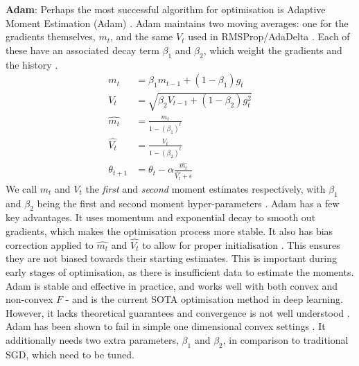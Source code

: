 \textbf{Adam}: Perhaps the most successful algorithm for optimisation is Adaptive Moment Estimation (Adam) \citep{kingma2014adam}. Adam maintains two moving averages: one for the gradients themselves, $m_t$, and the same $V_t$ used in RMSProp/AdaDelta \citep{kingma2014adam}. Each of these have an associated decay term $\beta_1$ and $\beta_2$, which weight the gradients and the history \citep{kingma2014adam}.
\begin{align}
m_t &= \beta_1 m_{t-1} + (1 - \beta_1) g_t \label{eq:m_t} \\
V_t &= \sqrt{\beta_2 V_{t-1} + (1 - \beta_2) g_t^2} \\
\hat{m_t} &= \frac{m_t}{1 - (\beta_1)^t} \\
\hat{V_t} &= \frac{V_t}{1 - (\beta_2)^t} \\
\theta_{t+1} &= \theta_t - \alpha \frac{\hat{m_t}}{{\hat{V_t}} + \epsilon} \label{eq:adam_update}
\end{align}
We call $m_t$ and $V_t$ the \textit{first} and \textit{second} moment estimates respectively, with $\beta_1$ and $\beta_2$ being the first and second moment hyper-parameters \citep{kingma2014adam}. Adam has a few key advantages. It uses momentum and exponential decay to smooth out gradients, which makes the optimisation process more stable. It also has bias correction applied to $\hat{m_t}$ and $\hat{V_t}$ to allow for proper initialisation \citep{kingma2014adam}. This ensures they are not biased towards their starting estimates. This is important during early stages of optimisation, as there is insufficient data to estimate the moments. Adam is stable and effective in practice, and works well with both convex and non-convex $F$ - and is the current SOTA optimisation method in deep learning. However, it lacks theoretical guarantees and convergence is not well understood \citep{reddi2019asmgrad}. Adam has been shown to fail in simple one dimensional convex settings \citep{reddi2019asmgrad}. It additionally needs two extra parameters, $\beta_1$ and $\beta_2$, in comparison to traditional SGD, which need to be tuned.

